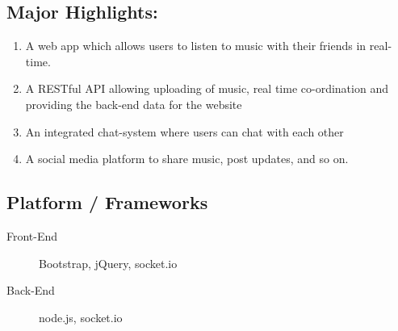 \documentclass{article}
\begin{document}
\subsection{Major Highlights:}
\begin{enumerate}
    \item {A web app which allows users to listen to music with their friends in real-time.}
    \item {A RESTful API allowing uploading of music, real time co-ordination and providing the back-end data for the website}
    \item {An integrated chat-system where users can chat with each other}
    \item {A social media platform to share music, post updates, and so on.}
\end{enumerate}

\subsection{Platform / Frameworks}
\begin{description}
    \item [Front-End] Bootstrap, jQuery, socket.io
    \item [Back-End] node.js, socket.io
\end{description}
\end{document}

